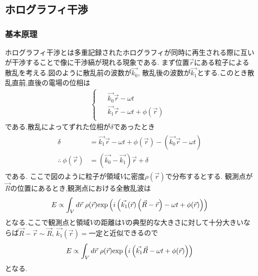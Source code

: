 \subsection{ホログラフィ干渉}
\subsubsection{基本原理}
ホログラフィ干渉とは多重記録されたホログラフィが同時に再生される際に互いが干渉することで像に干渉縞が現れる現象である.
まず位置$\vec{r}$にある粒子による散乱を考える.図のように散乱前の波数が$\vec{k_0}$,
散乱後の波数が$\vec{k_1}$とする.このとき散乱直前,直後の電場の位相は
\begin{align}
  \begin{cases}
    \begin{split}
      &\vec{k_0}\vec{r}-\omega t\\
      &\vec{k_1}\vec{r}-\omega t+\phi(\vec{r})
    \end{split}
  \end{cases}
\end{align}
である.散乱によってずれた位相が$\delta$であったとき
\begin{align}
  \begin{split} 
    \delta&=\vec{k_1}\vec{r}-\omega t+\phi(\vec{r})-(\vec{k_0}\vec{r}-\omega t)\\
    \therefore\ \phi(\vec{r})&=(\vec{k_0}-\vec{k_1})\vec{r}+\delta
  \end{split}
\end{align}
である.
ここで図のように粒子が領域$V$に密度$\rho(\vec{r})$で分布するとする.
観測点が$\vec{R}$の位置にあるとき,観測点における全散乱波は
\begin{align}
  E\propto\int_Vd\vec{r}\ \rho(\vec{r}){\rm exp}\left(i\left(\vec{k_1}(\vec{r})\left(\vec{R}-\vec{r}\right)-\omega t+\phi(\vec{r})\right)\right)
\end{align}
となる.ここで観測点と領域$V$の距離は$V$の典型的な大きさに対して十分大きいならば$\vec{R}-\vec{r}\sim\vec{R}$,
$\vec{k_1}(\vec{r})=一定$と近似できるので
\begin{align}
  E\propto\int_Vd\vec{r}\ \rho(\vec{r}){\rm exp}\left(i\left(\vec{k_1}\vec{R}-\omega t+\phi(\vec{r})\right)\right)
\end{align}
となる.

